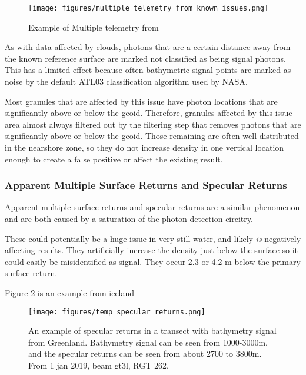 \begin{figure}[h!]
    \centering
    \texttt{[image: figures/multiple\_telemetry\_from\_known\_issues.png]}
    \caption{Example of Multiple telemetry from \cite{atl03knownissues}}
    \label{fig:multiple_tel_bands}
\end{figure}

As with data affected by clouds, photons that are a certain distance away from the known reference surface are marked not classified as being signal photons. This has a limited effect because often bathymetric signal points are marked as noise by the default ATL03 classification algorithm used by NASA. 

Most granules that are affected by this issue have photon locations that are significantly above or below the geoid. Therefore, granules affected by this issue area almost always filtered out by the filtering step that removes photons that are significantly above or below the geoid. Those remaining are often well-distributed in the nearshore zone, so they do not increase density in one vertical location enough to create a false positive or affect the existing result. 

\subsubsection{Apparent Multiple Surface Returns and Specular Returns}

Apparent multiple surface returns and specular returns are a similar phenomenon and are both caused by a saturation of the photon detection circitry. 

These could potentially be a huge issue in very still water, and likely \emph{is} negatively affecting results. They artificially increase the density just below the surface so it could easily be misidentified as signal. They occur 2.3 or 4.2 m below the primary surface return.

Figure \ref{fig:multiple-surf-returns} is an example from iceland 

\begin{figure}[h!]
    \centering
    \texttt{[image: figures/temp\_specular\_returns.png]}
    \caption{An example of specular returns in a transect with bathymetry signal from Greenland. Bathymetry signal can be seen from 1000-3000m, and the specular returns can be seen from about 2700 to 3800m. From 1 jan 2019, beam gt3l, RGT 262.}
    \label{fig:multiple-surf-returns}
\end{figure}

